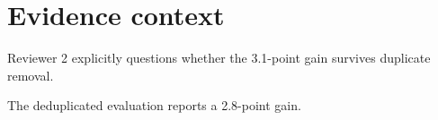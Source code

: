 \section{Evidence context}
Reviewer 2 explicitly questions whether the 3.1-point gain survives duplicate removal.

The deduplicated evaluation reports a 2.8-point gain.
